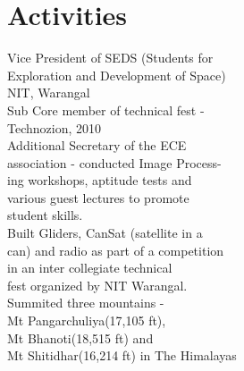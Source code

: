 \documentclass[letterpaper]{deedy-resume} %
\begin{document}
\begin{minipage}[t]{0.33\textwidth} %



\section{Activities}
\textbullet{} Vice President of SEDS (Students for \\ \hphantom{\textbullet{}} Exploration and Development of Space) \\ \hphantom{\textbullet{}} NIT, Warangal \\
\textbullet{} Sub Core member of technical fest - \\ \hphantom{\textbullet{}} Technozion, 2010 \\
\textbullet{} Additional Secretary of the ECE \\ \hphantom{\textbullet{}} association - conducted Image Process- \\ \hphantom{\textbullet{}} ing workshops, aptitude tests and \\ \hphantom{\textbullet{}} various guest lectures to promote \\ \hphantom{\textbullet{}} student skills. \\
\textbullet{} Built Gliders, CanSat (satellite in a \\ \hphantom{\textbullet{}} can) and radio as part of a competition \\ \hphantom{\textbullet{}} in an inter collegiate technical \\ \hphantom{\textbullet{}} fest organized by NIT Warangal. \\
\textbullet{} Summited three mountains - \\ \hphantom{\textbullet{}} Mt Pangarchuliya(17,105 ft), \\ \hphantom{\textbullet{}} Mt Bhanoti(18,515 ft) and \\ \hphantom{\textbullet{}} Mt Shitidhar(16,214 ft) in The Himalayas \\

\sectionspace %

\end{minipage} %
\end{document}
